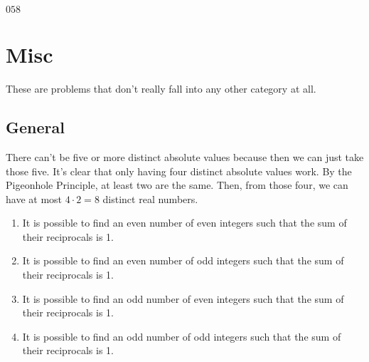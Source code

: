 \documentclass[11pt]{article}
\begin{document}

\begin{sol}
$\boxed{058}$
\end{sol}
\setcounter{problem}{0}

\section{Misc}
These are problems that don't really fall into any other category at all.

\subsection{General}

\begin{sol}
There can't be five or more distinct absolute values because then we can just take those five. It's clear that only having four distinct absolute values work. By the Pigeonhole Principle, at least two are the same. Then, from those four, we can have at most $4\cdot 2=\boxed{8}$ distinct real numbers.
\end{sol}


\begin{enumerate}
	\item It is possible to find an even number of even integers such that the sum of their reciprocals is 1.

	\item It is possible to find an even number of odd integers such that the sum of their reciprocals is 1.

	\item It is possible to find an odd number of even integers such that the sum of their reciprocals is 1.
	
	\item It is possible to find an odd number of odd integers such that the sum of their reciprocals is 1.
\end{enumerate}
\end{document}
